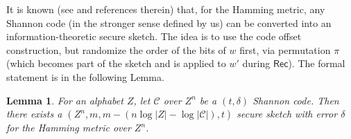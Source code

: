 \documentclass[11pt]{article}
\newcommand{\class}[1]{{\ensuremath{\mathsf{#1}}}}
\newcommand{\sketch}{\ensuremath{\class{SS}}\xspace}
\newcommand{\rec}{\ensuremath{\class{Rec}}\xspace}
\newcommand{\Hoo}{\mathrm{H}_\infty}
\newcommand{\Hav}{\tilde{\mathrm{H}}_\infty}
\newtheorem{lemma}[theorem]{Lemma}
\newcommand{\authnote}[2]{{\textcolor{red}{\textsf{#1 notes: }\textcolor{blue}{ #2}}\marginpar{\textcolor{red}{\textbf{!!!!!}}}}}
\newcommand{\authnote}[2]{}
\newcommand{\lnote}[1]{{\authnote{Leo}{#1}}}
\begin{document}
It is known (see \cite[Section 8.2]{DBLP:journals/siamcomp/DodisORS08} and references therein) that, for the Hamming metric, any Shannon code (in the stronger sense defined by us) can be converted into an information-theoretic secure sketch.  The idea is to use the code offset construction, but randomize the order of the bits of $w$ first, via  permutation $\pi$  (which  becomes part of the sketch and is applied to $w'$ during $\rec$). The formal statement is in the following Lemma.
\begin{lemma}
\label{lem:shannon to sketch}
For an alphabet $Z$, let $\mathcal{C}$ over $Z^n$ be a $(t, \delta)$ Shannon code.%
%
Then there exists a $(Z^n, m, m-(n\log|Z|-\log |\mathcal{C}|), t)$ secure sketch with error $\delta$ for the Hamming metric over $Z^n$. 
\end{lemma}
\end{document}
